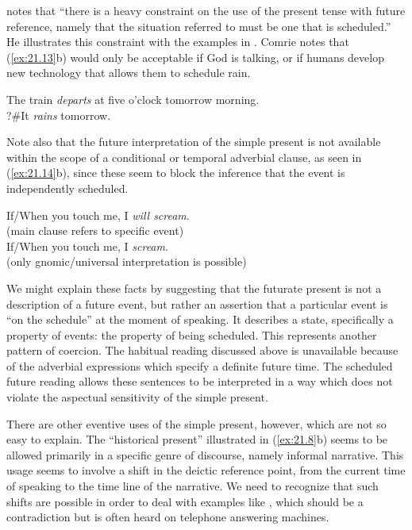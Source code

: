 \citet[47]{Comrie1976} notes that “there is a heavy constraint on the use of the present tense with future reference, namely that the situation referred to must be one that is scheduled.” He illustrates this constraint with the examples in . Comrie notes that (\ref{ex:21.13}b) would only be acceptable if God is talking, or if humans develop new technology that allows them to schedule rain.

\ea \label{ex:21.13}
\ea  The train \textit{departs} at five o’clock tomorrow morning.\\
\ex ?\#It \textit{rains} tomorrow.
                       \z
\z

Note also that the future interpretation of the simple present is not available within the scope of a conditional or temporal adverbial clause, as seen in (\ref{ex:21.14}b), since these seem to block the inference that the event is independently scheduled.

\ea \label{ex:21.14}
\ea  If/When you touch me, I \textit{will scream}. \\ 
\hfill  (main clause refers to specific event)\\
\ex If/When you touch me, I \textit{scream}. \\ 
\hfill  (only gnomic/universal interpretation is possible)
                       \z
\z

We might explain these facts by suggesting that the futurate present is not a description of a future event, but rather an assertion that a particular event is “on the schedule” at the moment of speaking. It describes a state, specifically a property of events: the property of being scheduled. This represents another pattern of coercion. The habitual reading discussed above is unavailable because of the adverbial expressions which specify a definite future time. The scheduled future reading allows these sentences to be interpreted in a way which does not violate the aspectual sensitivity of the simple present.


There are other eventive uses of the simple present, however, which are not so easy to explain. The “historical present” illustrated in (\ref{ex:21.8}b) seems to be allowed primarily in a specific genre of discourse, namely informal narrative. This usage seems to involve a shift in the deictic reference point, from the current time of speaking to the time line of the narrative. We need to recognize that such shifts are possible in order to deal with examples like , which should be a contradiction but is often heard on telephone answering machines.


